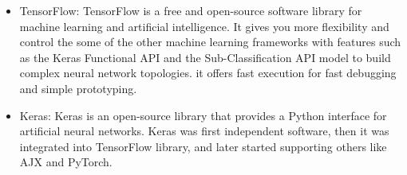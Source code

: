 \begin{itemize}
	\item TensorFlow: TensorFlow is a free and open-source software library for machine learning and artificial intelligence. It gives you more flexibility and control the some of the other machine learning frameworks with features such as the Keras Functional API and the Sub-Classification API model to build complex neural network topologies. it offers fast execution for fast debugging and simple prototyping.\cite{tf}
	

	\item Keras: Keras is an open-source library that provides a Python interface for artificial neural networks. Keras was first independent software, then it was integrated into TensorFlow library, and later started supporting others like AJX and PyTorch.\cite{keras}




	

\end{itemize}

















